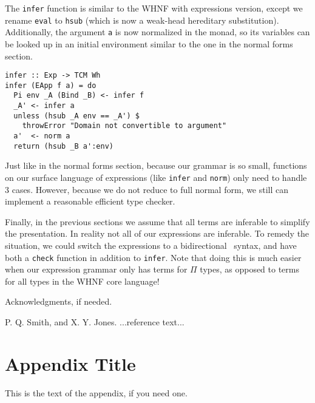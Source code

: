 \documentclass[preprint,authoryear]{sigplanconf}
\begin{document}
The \texttt{infer} function is similar to the WHNF with expressions
version, except we rename \texttt{eval} to \texttt{hsub} (which is now a
weak-head hereditary substitution). Additionally, the argument
\texttt{a} is now normalized in the monad, so its variables can be
looked up in an initial environment similar to the one in the normal
forms section.

\begin{verbatim}
infer :: Exp -> TCM Wh
infer (EApp f a) = do
  Pi env _A (Bind _B) <- infer f
  _A' <- infer a
  unless (hsub _A env == _A') $
    throwError "Domain not convertible to argument"
  a'  <- norm a
  return (hsub _B a':env)
\end{verbatim}

Just like in the normal forms section, because our grammar is so
small, functions on our surface language of expressions (like
\texttt{infer} and \texttt{norm}) only need to handle 3 cases.
However, because we do not reduce to full normal form, we still can
implement a reasonable efficient type checker.

Finally, in the previous sections we assume that all terms are
inferable to simplify the presentation. In reality not all of our expressions
are inferable. To remedy the situation, we could switch the
expressions to a bidirectional~\cite{TODO} syntax, and have both a \texttt{check}
function in addition to \texttt{infer}. Note that doing this is much
easier when our expression grammar only has terms for $\Pi$ types, as
opposed to terms for all types in the WHNF core language!

\acks

Acknowledgments, if needed.





\begin{thebibliography}{}
\softraggedright

P. Q. Smith, and X. Y. Jones. ...reference text...

\end{thebibliography}

\appendix
\section{Appendix Title}

This is the text of the appendix, if you need one.
\end{document}
